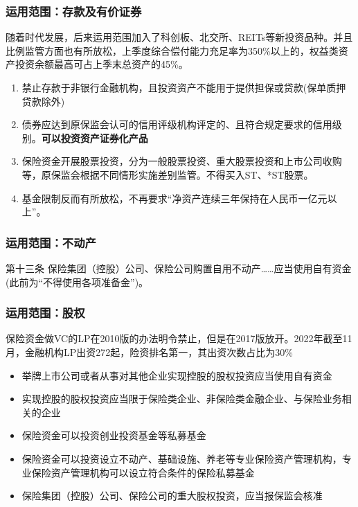\documentclass[a4paper,12pt]{ctexbeamer}
\begin{document}
\begin{frame}
    \frametitle{运用范围：存款及有价证券}
    随着时代发展，后来运用范围加入了科创板、北交所、REITs等新投资品种。并且比例监管方面也有所放松，上季度综合偿付能力充足率为350\%以上的，权益类资产投资余额最高可占上季末总资产的45\%。
    \begin{enumerate}
        \item 禁止存款于非银行金融机构，且投资资产不能用于提供担保或贷款(保单质押贷款除外)
        \item 债券应达到原保监会认可的信用评级机构评定的、且符合规定要求的信用级别。\textbf{可以投资资产证券化产品}
        \item 保险资金开展股票投资，分为一般股票投资、重大股票投资和上市公司收购等，原保监会根据不同情形实施差别监管。不得买入ST、*ST股票。
        \item 基金限制反而有所放松，不再要求“净资产连续三年保持在人民币一亿元以上”。
    \end{enumerate}
\end{frame}
\begin{frame}
    \frametitle{运用范围：不动产}
    \begin{block}{第十三条}
        保险集团（控股）公司、保险公司购置自用不动产……应当使用自有资金(此前为“不得使用各项准备金”)。
    \end{block}
\end{frame}
\begin{frame}
    \frametitle{运用范围：股权}
    保险资金做VC的LP在2010版的办法明令禁止，但是在2017版放开。2022年截至11月，金融机构LP出资272起，险资排名第一，其出资次数占比为30\%
    \begin{itemize}
        \item 举牌上市公司或者从事对其他企业实现控股的股权投资应当使用自有资金
        \item 实现控股的股权投资应当限于保险类企业、非保险类金融企业、与保险业务相关的企业
        \item 保险资金可以投资创业投资基金等私募基金
        \item 保险资金可以投资设立不动产、基础设施、养老等专业保险资产管理机构，专业保险资产管理机构可以设立符合条件的保险私募基金
        \item 保险集团（控股）公司、保险公司的重大股权投资，应当报保监会核准
    \end{itemize}
\end{frame}
\end{document}

